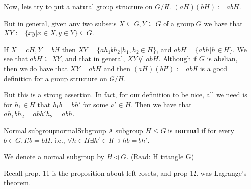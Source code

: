 \documentclass{article}
\begin{document}
Now, lets try to put a natural group structure on $G/H$. $(aH)(bH) := abH$. 

But in general, given any two subsets $X \subseteq G, Y \subseteq G$ of a group $G$ we have that $XY := \{ xy | x \in X, y \in Y \} \subseteq G$.

If $X = aH, Y = bH$ then $XY = \{ ah_1bh_2 | h_1, h_2 \in H \}$, and $abH = \{ abh | h \in H \}$. We see that $abH \subseteq XY$, and that in general, $XY \not\subseteq abH$. Although if $G$ is abelian, then we do have that $XY = abH$ and then $(aH)(bH) := abH$ is a good definition for a group structure on $G/H$. 

But this is a strong assertion. In fact, for our definition to be nice, all we need is for $h_1 \in H$ that $h_1b = bh'$ for some $h' \in H$. Then we have that $ah_1bh_2 = abh'h_2 = abh$.

\begin{cdef}{Normal subgroup}{normalSubgroup}
    A subgroup $H \leq G$ is \textbf{normal} if for every $b\in G, Hb = bH$.
    i.e., $\forall h\in H \exists h' \in H \ni hb = bh'$.

    We denote a normal subgroup by $H \triangleleft G$. (Read: H triangle G)
\end{cdef}

Recall prop. 11 is the proposition about left cosets, and prop 12. was Lagrange's theorem.
\end{document}
